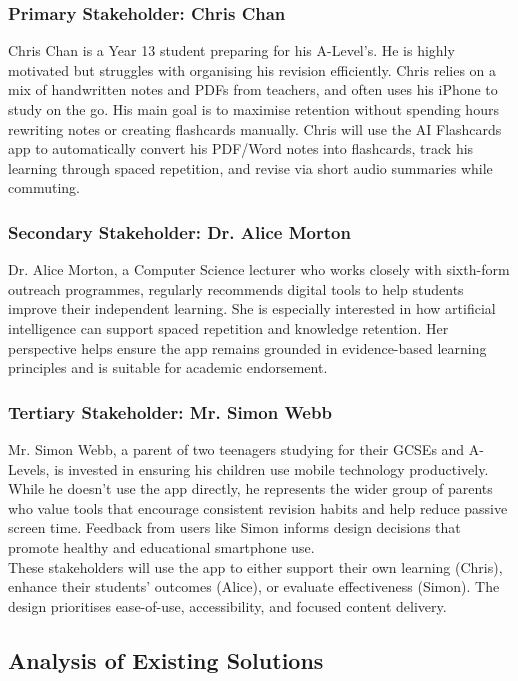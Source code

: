\documentclass[a4paper,12pt]{article}
\begin{document}
\subsubsection*{Primary Stakeholder: Chris Chan}
Chris Chan is a Year 13 student preparing for his A-Level's. He is highly motivated but struggles with organising his revision efficiently. Chris relies on a mix of handwritten notes and PDFs from teachers, and often uses his iPhone to study on the go. His main goal is to maximise retention without spending hours rewriting notes or creating flashcards manually. Chris will use the AI Flashcards app to automatically convert his PDF/Word notes into flashcards, track his learning through spaced repetition, and revise via short audio summaries while commuting.

\subsubsection*{Secondary Stakeholder: Dr. Alice Morton}
Dr. Alice Morton, a Computer Science lecturer who works closely with sixth-form outreach programmes, regularly recommends digital tools to help students improve their independent learning. She is especially interested in how artificial intelligence can support spaced repetition and knowledge retention. Her perspective helps ensure the app remains grounded in evidence-based learning principles and is suitable for academic endorsement.

\subsubsection*{Tertiary Stakeholder: Mr. Simon Webb}
Mr. Simon Webb, a parent of two teenagers studying for their GCSEs and A-Levels, is invested in ensuring his children use mobile technology productively. While he doesn’t use the app directly, he represents the wider group of parents who value tools that encourage consistent revision habits and help reduce passive screen time. Feedback from users like Simon informs design decisions that promote healthy and educational smartphone use. \\
\newline
These stakeholders will use the app to either support their own learning (Chris), enhance their students' outcomes (Alice), or evaluate effectiveness (Simon). The design prioritises ease-of-use, accessibility, and focused content delivery.

\newpage

\subsection{Analysis of Existing Solutions}
\end{document}
